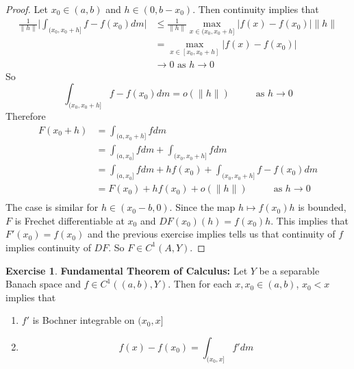 \documentclass[12pt]{amsart}
\theoremstyle{definition}
\newtheorem{ex}[definition]{Exercise}
\newcommand{\lex}[1]{\label{ex:#1}}
\begin{document}
	\begin{proof}
	Let $x_0 \in (a,b)$ and $h \in (0, b-x_0)$. Then continuity implies that
	\begin{align*}
	\frac{1}{\|h\|} \bigg | \int_{(x_0, x_0 + h]}f - f(x_0) dm \bigg |
	& \leq  \frac{1}{\|h\|} \max_{x \in (x_0, x_0+h]} |f(x) - f(x_0)| \|h\| \\
	&= \max_{x \in [x_0, x_0+h]} |f(x) - f(x_0)| \\
	& \rightarrow 0  \text{ as } h \rightarrow 0
\end{align*}	  
So $$\int_{(x_0, x_0 + h]}f - f(x_0) dm = o(\|h\|) \hspace{1cm}\text{ as }h \rightarrow 0$$ 
	Therefore 
	\begin{align*}
	F(x_0 + h)
	&= \int_{(a, x_0 + h]} f dm  \\
	&= \int_{(a, x_0]} f dm + \int_{(x_0, x_0 + h]} fdm \\
	&= \int_{(a, x_0]} f dm + hf(x_0) + \int_{(x_0, x_0 + h]} f - f(x_0) dm \\ 
	&= F(x_0 ) + hf(x_0) + o(\|h\|) \hspace{1cm }\text{ as } h \rightarrow 0\\
	\end{align*}
	The case is similar for $h \in (x_0 - b, 0)$. Since the map $h \mapsto f(x_0)h$ is bounded, $F$ is Frechet differentiable at $x_0$ and $DF(x_0)(h) = f(x_0)h$. This implies that $F'(x_0) = f(x_0)$ and the previous exercise implies tells us that continuity of $f$ implies continuity of $DF$. So $F \in C^1(A, Y)$.
	\end{proof}
	
	\begin{ex} \lex{}\textbf{Fundamental Theorem of Calculus:}
	Let $Y$ be a separable Banach space and $f \in C^1((a,b), Y)$. Then for each $x, x_0 \in (a,b)$, $x_0 < x$ implies that 
	\begin{enumerate}
	\item $f'$ is Bochner integrable on $(x_0, x]$ 
	\item  $$f(x) - f(x_0) = \int_{(x_0, x]}f'dm$$ 
	\end{enumerate}
	\end{ex}
\end{document}
